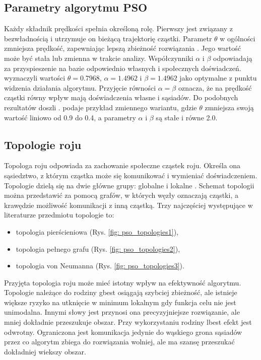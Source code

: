 \subsection{Parametry algorytmu PSO}
Każdy składnik prędkości spełnia określoną rolę. Pierwszy jest związany z bezwładnością i utrzymuje on bieżącą trajektorię cząstki. Parametr $\theta$ w ogólności zmniejsza prędkość, zapewniając lepszą zbieżność rozwiązania \parencite{Blackwell2019}. Jego wartość może być stała lub zmienna w trakcie analizy. Współczynniki $\alpha$ i $\beta$ odpowiadają za przyspieszenie na bazie odpowiednio własnych i społecznych doświadczeń. 
\cite{Clerc2002} wyznaczyli wartości $\theta=0.7968$, $\alpha=1.4962$ i $\beta=1.4962$ jako optymalne z punktu widzenia działania algorytmu. Przyjęcie równości $\alpha=\beta$ oznacza, że na prędkość cząstki równy wpływ mają doświadczenia własne i sąsiadów. Do podobnych rezultatów doszli \cite{Shi1998}. \cite{Xu2007} podaje przykład zmiennego wariantu, gdzie $\theta$ zmniejsza swoją wartość liniowo od 0.9 do 0.4, a parametry $\alpha$ i $\beta$ są stałe i równe 2.0.
\subsection{Topologie roju}
Topologa roju odpowiada za zachowanie społeczne cząstek roju. Określa ona sąsiedztwo, z którym cząstka może się komunikować i wymieniać doświadczeniem. Topologie dzielą się na dwie główne grupy: globalne  i lokalne . Schemat topologii można przedstawić za pomocą grafów, w których węzły oznaczają cząstki, a krawędzie możliwość komunikacji z inną cząstką. Trzy najczęściej występujące w literaturze przedmiotu topologie to:
\begin{itemize}
	\item topologia pierścieniowa (Rys. \ref{fig: pso_topologies1}),
	\item topologia pełnego grafu (Rys. \ref{fig: pso_topologies2}),
	\item topologia von Neumanna (Rys. \ref{fig: pso_topologies3}).
\end{itemize}
\begin{figure}[h]
	\centering
	\captionsetup{justification=centering}
	\caption{}
	\label{fig: pso_topologies}
\end{figure}
Przyjęta topologia roju może mieć istotny wpływ na efektywność algorytmu. Topologie należące do rodziny gbest osiągają szybciej zbieżność, ale istnieje większe ryzyko na utknięcie w minimum lokalnym gdy funkcja celu nie jest unimodalna. Innymi słowy jest przynosi ona precyzyjniejsze rozwiązanie, ale mniej dokładnie przeszukuje obszar. Przy wykorzystaniu rodziny lbest efekt jest odwrotny. Ograniczona jest komunikacja jedynie do wąskiego grona sąsiadów przez co algorytm zbiega do rozwiązania wolniej, ale ma szansę przeszukać dokładniej wiekszy obszar.




